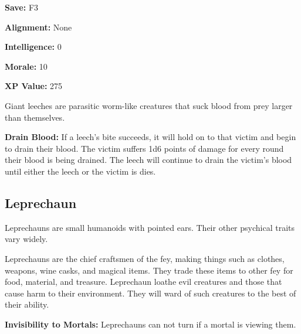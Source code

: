 \begin{multicols*}{2}
{\textbf{Save:} F3

\textbf{Alignment:} None

\textbf{Intelligence:} 0

\textbf{Morale:} 10

\textbf{XP Value:} 275}

Giant leeches are parasitic worm-like creatures that suck blood from prey larger than themselves.

\textbf{Drain Blood:} If a leech’s bite succeeds, it will hold on to that victim and begin to drain their blood. The victim suffers 1d6 points of damage for every round their blood is being drained. The leech will continue to drain the victim's blood until either the leech or the victim is dies.

\subsection{Leprechaun}

Leprechauns are small humanoids with pointed ears. Their other psychical traits vary widely.

Leprechauns are the chief craftsmen of the fey, making things such as clothes, weapons, wine casks, and magical items. They trade these items to other fey for food, material, and treasure. Leprechaun loathe evil creatures and those that cause harm to their environment. They will ward of such creatures to the best of their ability.

\textbf{Invisibility to Mortals:} Leprechauns can not turn  if a mortal is viewing them.


\end{multicols*}

